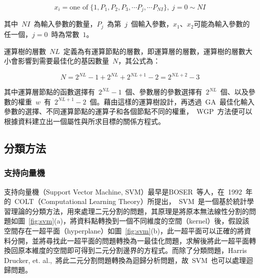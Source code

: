 \begin{equation} x_i = \text{one of}\; \{1, P_1, P_2, P_3, \cdots P_j, \cdots P_{NI}\},\; j = 0 \sim NI \label{eq:WGP-xi}\end{equation}

其中~$NI$~為輸入參數的數量，$P_j$~為第~$j$~個輸入參數，$x_1$、$x_2$可能為輸入參數的任一個，$j = 0$~時為常數~$1$。

運算樹的層數~$NL$~定義為有運算節點的層數，即運算層的層數，運算樹的層數大小會影響到需要最佳化的基因數量~$N$，其公式為：

\begin{equation} N = 2^{NL} - 1 + 2^{NL} + 2^{NL + 1} - 2 = 2^{NL + 2} - 3  \label{eq:WGP-N}\end{equation}


其中運算層節點的函數選擇有~$2^{NL} - 1$~個、參數層的參數選擇有~$2^{NL}$~個、以及參數的權重~$w$~有~$2^{NL + 1} - 2$~個。藉由這樣的運算樹設計，再透過~GA~最佳化輸入參數的選擇、不同運算節點的運算子和各個節點不同的權重，~WGP~方法便可以根據資料建立出一個屬性與所求目標的關係方程式。

\subsection{分類方法}

\subsubsection{支持向量機}

支持向量機（Support Vector Machine, SVM）最早是BOSER~\cite{boser1992}等人，在~1992~年的~COLT（Computational Learning Theory）所提出，~SVM~是一個基於統計學習理論的分類方法，用來處理二元分割的問題，其原理是將原本無法線性分割的問題如圖~\ref{fig:svm}(a)，將資料點轉換到一個不同維度的空間（kernel）後，假設該空間存在一超平面（hyperplane）如圖~\ref{fig:svm}(b)，此一超平面可以正確的將資料分開，並將尋找此一超平面的問題轉換為一最佳化問題，求解後將此一超平面轉換回原本維度的空間即可得到二元分割邊界的方程式。而除了分類問題，Harris Drucker, et. al.,\cite{drucker1997support}~將此二元分割問題轉換為迴歸分析問題，故~SVM~也可以處理迴歸問題。

